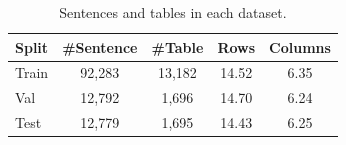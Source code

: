 \begin{table}[ht]
\center
\begin{tabular}{lcccc}
\hline
Split & \#Sentence & \#Table & Rows & Columns\\
\hline
Train & 92,283 & 13,182 & 14.52 & 6.35\\
Val & 12,792 & 1,696 & 14.70 & 6.24\\
Test & 12,779 & 1,695 & 14.43 & 6.25\\
\hline
\end{tabular}
\caption{Sentences and tables in each dataset.}
\label{tab:tabfact_train_val_test_split}
\end{table}